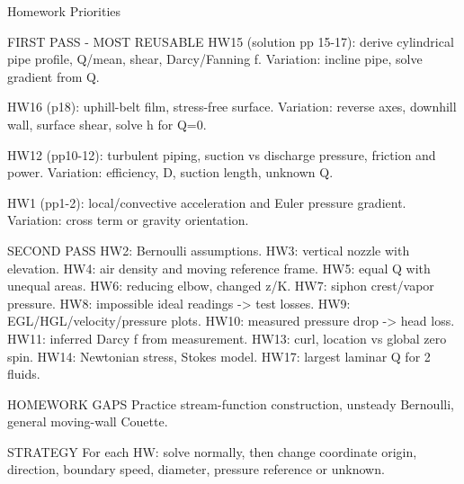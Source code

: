 Homework Priorities

FIRST PASS - MOST REUSABLE
HW15 (solution pp 15-17): derive cylindrical pipe profile, Q/mean, shear, Darcy/Fanning f. Variation: incline pipe, solve gradient from Q.

HW16 (p18): uphill-belt film, stress-free surface. Variation: reverse axes, downhill wall, surface shear, solve h for Q=0.

HW12 (pp10-12): turbulent piping, suction vs discharge pressure, friction and power. Variation: efficiency, D, suction length, unknown Q.

HW1 (pp1-2): local/convective acceleration and Euler pressure gradient. Variation: cross term or gravity orientation.

SECOND PASS
HW2: Bernoulli assumptions.
HW3: vertical nozzle with elevation.
HW4: air density and moving reference frame.
HW5: equal Q with unequal areas.
HW6: reducing elbow, changed z/K.
HW7: siphon crest/vapor pressure.
HW8: impossible ideal readings -> test losses.
HW9: EGL/HGL/velocity/pressure plots.
HW10: measured pressure drop -> head loss.
HW11: inferred Darcy f from measurement.
HW13: curl, location vs global zero spin.
HW14: Newtonian stress, Stokes model.
HW17: largest laminar Q for 2 fluids.

HOMEWORK GAPS
Practice stream-function construction, unsteady Bernoulli, general moving-wall Couette.

STRATEGY
For each HW: solve normally, then change coordinate origin, direction, boundary speed, diameter, pressure reference or unknown.
